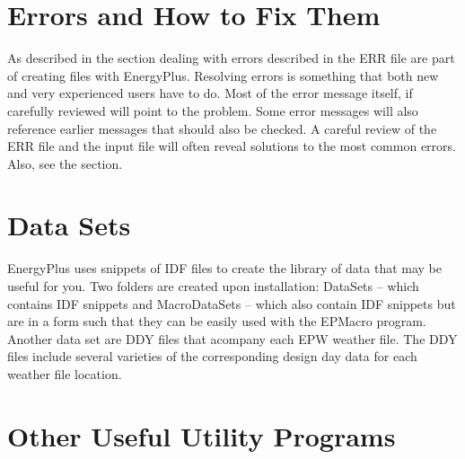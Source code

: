 \section{Errors and How to Fix Them}

As described in the  section
dealing with errors described in the ERR file are part of creating
files with EnergyPlus. Resolving errors is something that both new
and very experienced users have to do. Most of the error message itself,
if carefully reviewed will point to the problem. Some error messages
will also reference earlier messages that should also be checked.
A careful review of the ERR file and the input file will often reveal
solutions to the most common errors. Also, see the 
section.

\section{Data Sets}

EnergyPlus uses snippets of IDF files to create the library of data
that may be useful for you. Two folders are created upon installation:
DataSets -- which contains IDF snippets and MacroDataSets -- which
also contain IDF snippets but are in a form such that they can be
easily used with the EPMacro program. Another data set are DDY files
that acompany each EPW weather file. The DDY files include several
varieties of the corresponding design day data for each weather file
location.

\section{Other Useful Utility Programs}

